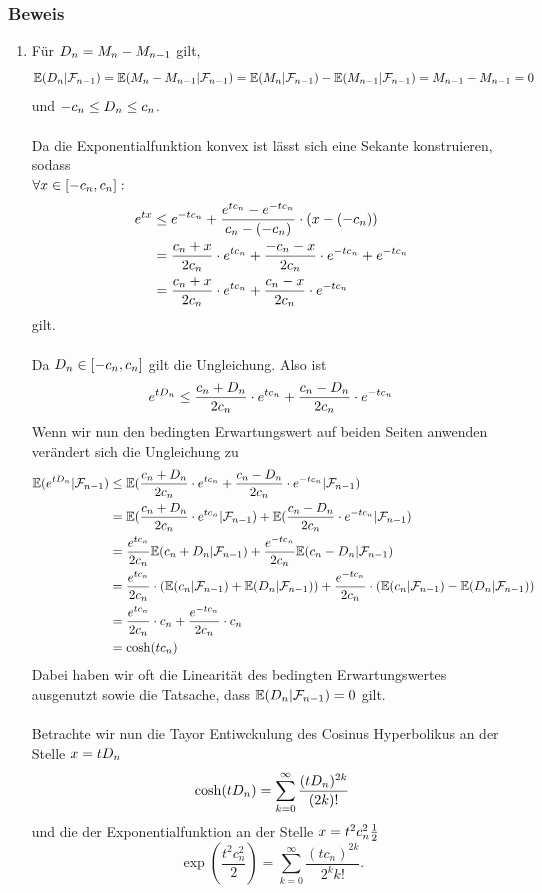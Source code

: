 \documentclass[12pt]{scrartcl}
\begin{document}
\subsubsection*{Beweis}
\einruecken

\begin{enumerate}[$i)$,wide]
	
\item Für $D_n = M_n - M_{n-1}$ gilt, 
$$\mathbb{E}(D_n | \mathcal{F}_{n-1}) = \mathbb{E}(M_n - M_{n-1} | \mathcal{F}_{n-1}) = \mathbb{E}(M_n | \mathcal{F}_{n-1}) - \mathbb{E}(M_{n-1} | \mathcal{F}_{n-1}) =  M_{n-1} - M_{n-1} = 0 $$ 
und $-c_n \leq D_n \leq c_n$. \\
\\
Da die Exponentialfunktion konvex ist lässt sich eine Sekante konstruieren, sodass \\
$\forall x \in [-c_n, c_n]:$
\begin{align}
	e^{tx} & \leq {e^{-tc_n}} + \frac{{e^{tc_n}} - {e^{-tc_n}}}{c_n - (-c_n)} \cdot (x- (-c_n)) \\
	& = \frac{c_n + x}{2c_n} \cdot {e^{tc_n}} + \frac{-c_n - x }{2c_n} \cdot {e^{-tc_n}} + {e^{-tc_n}}\\
	& = \frac{c_n + x}{2c_n} \cdot {e^{tc_n}} + \frac{c_n - x}{2c_n} \cdot {e^{-tc_n}}
\end{align}
gilt.\\
\\
Da $D_n \in [-c_n , c_n]$ gilt die Ungleichung. Also ist $$e^{tD_n} \leq \frac{c_n + D_n}{2c_n} \cdot {e^{tc_n}} + \frac{c_n - D_n}{2c_n} \cdot {e^{-tc_n}} $$
Wenn wir nun den bedingten Erwartungswert auf beiden Seiten anwenden verändert sich die Ungleichung zu
\begin{align}
	\mathbb{E} (e^{tD_n} | \mathcal{F}_{n-1}) & \leq \mathbb{E} (\frac{c_n + D_n}{2c_n} \cdot {e^{tc_n}} + \frac{c_n - D_n}{2c_n} \cdot {e^{-tc_n}} | \mathcal{F}_{n-1}) \\
	& = \mathbb{E} (\frac{c_n + D_n}{2c_n} \cdot {e^{tc_n}} | \mathcal{F}_{n-1} ) + \mathbb{E} ( \frac{c_n - D_n}{2c_n} \cdot {e^{-tc_n}}| \mathcal{F}_{n-1} ) \\   
	& = \frac{{e^{tc_n}}}{2c_n} \mathbb{E} (c_n + D_n | \mathcal{F}_{n-1} ) + \frac{{e^{-tc_n}}}{2c_n} \mathbb{E} ( c_n - D_n | \mathcal{F}_{n-1} ) \\
	& = \frac{{e^{tc_n}}}{2c_n} \cdot (\mathbb{E} (c_n | \mathcal{F}_{n-1} ) + \mathbb{E} (D_n | \mathcal{F}_{n-1} )) + \frac{{e^{-tc_n}}}{2c_n} \cdot (\mathbb{E} (c_n | \mathcal{F}_{n-1} ) - \mathbb{E} (D_n | \mathcal{F}_{n-1} )) \\
	& = \frac{{e^{tc_n}}}{2c_n} \cdot c_n + \frac{{e^{-tc_n}}}{2c_n} \cdot c_n \\
	& = \cosh(tc_n)
\end{align}
Dabei haben wir oft die Linearität des bedingten Erwartungswertes ausgenutzt sowie die Tatsache, dass $\mathbb{E}(D_n | \mathcal{F}_{n-1}) = 0$ gilt.\\
\\
Betrachte wir nun die Tayor Entiwckulung des Cosinus Hyperbolikus an der Stelle $x = tD_n$ 
$$ \cosh (tD_n ) = \sum_{k=0}^{\infty} \frac{(tD_n)^{2k}}{(2k)!} $$
und die der Exponentialfunktion an der Stelle $x = t^2 c_n^2 \frac{1}{2}$
$$ \exp\left(\frac{t^2c_n^2}{2}\right)= \sum_{k=0}^{\infty} \frac{(tc_n)^{2k}}{2^k k!}.$$\\


\end{enumerate}
\end{document}
